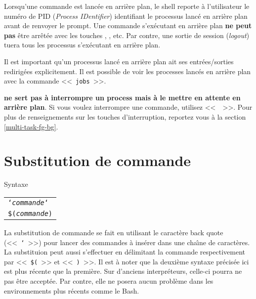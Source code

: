 Lorsqu'une commande est lanc{\'e}e en arri{\`e}re plan, le shell reporte
{\`a} l'utilisateur le num{\'e}ro de PID ({\sl Process IDentifier}) identifiant le processus
lanc{\'e} en arri{\`e}re plan avant de renvoyer le prompt. Une commande
s'ex{\'e}cutant en arri{\`e}re plan \textbf{ne peut pas} {\^e}tre
arr{\^e}t{\'e}e avec les touches , , etc.
Par contre, une sortie de session (\textsl{logout}) tuera tous les
processus s'ex{\'e}cutant en arri{\`e}re plan.

Il est important qu'un processus lanc{\'e} en arri{\`e}re plan ait ses
entr{\'e}es/sorties redirig{\'e}es explicitement. Il est possible de
voir les processes lanc{\'e}s en arri{\`e}re plan avec la commande
 <<~\texttt{jobs}~>>.

\begin{remarque}
 {\bf ne sert pas {\`a} interrompre un process mais {\`a} le mettre
en attente en arri{\`e}re plan}. Si vous voulez interrompre une commande,
utilisez <<~~>>. Pour plus de renseignements sur les touches
d'interruption, reportez vous {\`a} la section \ref{multi-task-fg-bg}.
\end{remarque}

\section{\label{multi-task-backq}Substitution de commande}

\begin{definition}{Syntaxe}
\begin{tabular}{@{\hspace{1cm}}l}
	{\tt `\textsl{commande}`}\\[0.2cm]
	{\tt \$(\textsl{commande})}	\\[0.2cm]
\end{tabular}
\end{definition}

La substitution de commande se fait en utilisant le caract{\`e}re back quote (<<~\texttt{`}~>>)
pour lancer des commandes {\`a} ins{\'e}rer dans une cha{\^\i}ne de caract{\`e}res. La substituion peut aussi
s'effectuer en d\'{e}limitant la commande respectivement par <<~\texttt{\$(}~>> et <<~\texttt{)}~>>. Il est \`{a}
noter que la deuxi\`{e}me syntaxe pr\'{e}cis\'{e}e ici est plus r\'{e}cente que la premi\`{e}re. Sur d'anciens
interpr\'{e}teurs, celle-ci pourra ne pas \^{e}tre accept\'{e}e. Par contre, elle ne posera aucun probl\`{e}me
dans les environnements plus r\'{e}cents comme le Bash.

